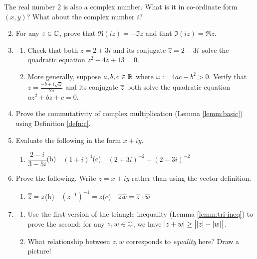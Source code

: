 \begin{exercises*}
	\exstart The real number 2 is also a complex number. What is it in co-ordinate form $(x,y)$? What about the complex number $i$?
	\begin{enumerate}\setcounter{enumi}{1}
	  \item For any $z\in\mathbb{C}$, prove that $\Re(iz)=-\Im z$ and that $\Im(iz)=\Re z$.
	  
	  \item\begin{enumerate}
	    \item Check that both $z=2+3i$ and its conjugate $\overline{z}=2-3i$ solve the quadratic equation $z^2-4z+13=0$.
	    \item More generally, suppose $a,b,c\in\mathbb{R}$ where $\omega:=4ac-b^2>0$. Verify that $z=\frac{-b+i\sqrt \omega}{2a}$ and its conjugate $\overline{z}$ both solve\footnotemark{} the quadratic equation $az^2+bz+c=0$.\par
	    
	  \end{enumerate}
	
	  \item Prove the commutativity of complex multiplication (Lemma \ref{lemm:basic}) using Definition \ref{defn:c}.
	  
	  \item Evaluate the following in the form $x+iy$.
	  \begin{enumerate}
	    \item $\dfrac{2-i}{3-5i}$\qquad (b)\ \ $(1+i)^4$\qquad (c)\ \ $(2+3i)^{-2}-(2-3i)^{-2}$
	  \end{enumerate}
	  
	  \item Prove the following. Write $z=x+iy$ rather than using the vector definition.
	  \begin{enumerate}
	    \item $\overline{\overline{z}}=z$\qquad (b)\ \ $(z^{-1})^{-1}=z$\qquad (c)\ \ $\overline{zw}=\overline{z}\cdot \overline{w}$
	  \end{enumerate}
	  
	  \item\label{ex:triangmod}\begin{enumerate}
	    \item Use the first version of the triangle inequality (Lemma \ref{lemm:tri-ineq}) to prove the second: for any $z,w\in\mathbb{C}$, we have $\displaystyle \left| z+w\right|\ge \bigl|\left| z\right|-\left| w\right|\bigr|$.
	    \item What relationship between $z,w$ corresponds to \emph{equality} here? Draw a picture!
	  \end{enumerate}
	  

\end{enumerate}
\end{exercises*}
